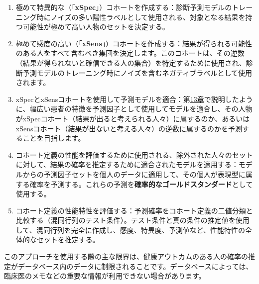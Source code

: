 \documentclass[
  11pt]{book}
\theoremstyle{definition}
\theoremstyle{definition}
\theoremstyle{definition}
\theoremstyle{definition}
\theoremstyle{remark}
\begin{document}
\begin{enumerate}
\def\labelenumi{\arabic{enumi}.}
\item
  極めて特異的な（「\textbf{xSpec}」）コホートを作成する：診断予測モデルのトレーニング時にノイズの多い陽性ラベルとして使用される、対象となる結果を持つ可能性が極めて高い人物のセットを決定する。
\item
  極めて感度の高い（「\textbf{xSens}」）コホートを作成する：結果が得られる可能性のある人をすべて含むべき集団を決定します。このコホートは、その逆数（結果が得られないと確信できる人の集合）を特定するために使用され、診断予測モデルのトレーニング時にノイズを含むネガティブラベルとして使用されます。
\item
  xSpecとxSensコホートを使用して予測モデルを適合：第\href{https://ohdsi.github.io/TheBookOfOhdsi/PatientLevelPrediction.html\#PatientLevelPrediction}{13章}で説明したように、幅広い患者の特徴を予測因子として使用してモデルを適合し、その人物がxSpecコホート（結果が出ると考えられる人々）に属するのか、あるいはxSensコホート（結果が出ないと考える人々）の逆数に属するのかを予測することを目指します。
\item
  コホート定義の性能を評価するために使用される、除外された人々のセットに対して、結果の確率を推定するために適合されたモデルを適用する：モデルからの予測因子セットを個人のデータに適用して、その個人が表現型に属する確率を予測する。これらの予測を\textbf{確率的なゴールドスタンダード}として使用する。
\item
  コホート定義の性能特性を評価する：予測確率をコホート定義の二値分類と比較する（混同行列のテスト条件）。テスト条件と真の条件の推定値を使用して、混同行列を完全に作成し、感度、特異度、予測値など、性能特性の全体的なセットを推定する。
\end{enumerate}

このアプローチを使用する際の主な限界は、健康アウトカムのある人の確率の推定がデータベース内のデータに制限されることです。データベースによっては、臨床医のメモなどの重要な情報が利用できない場合があります。
\end{document}
